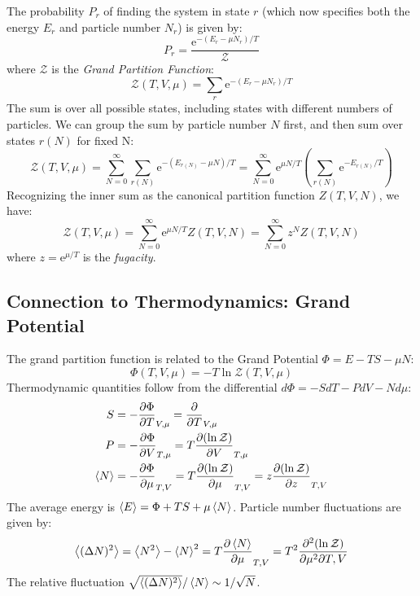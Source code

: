 \documentclass[10pt, letterpaper]{article}
\newcommand{\avg}[1]{\expval{#1}} %
\newcommand{\mathe}{\mathrm{e}} %
\begin{document}
The probability $P_r$ of finding the system in state $r$ (which now specifies both the energy $E_r$ and particle number $N_r$) is given by:
\begin{equation}
    P_r = \frac{\mathe^{-(E_r - \mu N_r) / T}}{\mathcal{Z}}
\end{equation}
where $\mathcal{Z}$ is the \textit{Grand Partition Function}:
\begin{equation}
    \mathcal{Z}(T, V, \mu) = \sum_r \mathe^{-(E_r - \mu N_r) / T}
\end{equation}
The sum is over all possible states, including states with different numbers of particles. We can group the sum by particle number $N$ first, and then sum over states $r(N)$ for fixed N:
\begin{equation}
    \mathcal{Z}(T, V, \mu) = \sum_{N=0}^\infty \sum_{r(N)} \mathe^{-(E_{r(N)} - \mu N) / T} = \sum_{N=0}^\infty \mathe^{\mu N / T} \left( \sum_{r(N)} \mathe^{-E_{r(N)} / T} \right)
\end{equation}
Recognizing the inner sum as the canonical partition function $Z(T, V, N)$, we have:
\begin{equation}
    \mathcal{Z}(T, V, \mu) = \sum_{N=0}^\infty \mathe^{\mu N / T} Z(T, V, N) = \sum_{N=0}^\infty z^N Z(T, V, N)
\end{equation}
where $z = \mathe^{\mu / T}$ is the \textit{fugacity}.

\subsection{Connection to Thermodynamics: Grand Potential}
The grand partition function is related to the Grand Potential $\Phi = E - TS - \mu N$:
\begin{equation}
    \boxed{\Phi(T, V, \mu) = -T \ln \mathcal{Z}(T, V, \mu)}
\end{equation}
Thermodynamic quantities follow from the differential $d\Phi = -S dT - P dV - N d\mu$:
\begin{align}
    S &= -\pdv{\Phi}{T}_{V,\mu} = \pdv{}{T}(T \ln \mathcal{Z})_{V,\mu} \\
    P &= -\pdv{\Phi}{V}_{T,\mu} = T \pdv{(\ln \mathcal{Z})}{V}_{T,\mu} \\
    \avg{N} &= -\pdv{\Phi}{\mu}_{T,V} = T \pdv{(\ln \mathcal{Z})}{\mu}_{T,V} = z \pdv{(\ln \mathcal{Z})}{z}_{T,V}
\end{align}
The average energy is $\avg{E} = \Phi + T S + \mu \avg{N}$.
Particle number fluctuations are given by:
\begin{equation}
    \avg{(\Delta N)^2} = \avg{N^2} - \avg{N}^2 = T \pdv{\avg{N}}{\mu}_{T,V} = T^2 \pdv[2]{(\ln \mathcal{Z})}{\mu^2}{T,V}
\end{equation}
The relative fluctuation $\sqrt{\avg{(\Delta N)^2}} / \avg{N} \sim 1/\sqrt{N}$.
\end{document}
